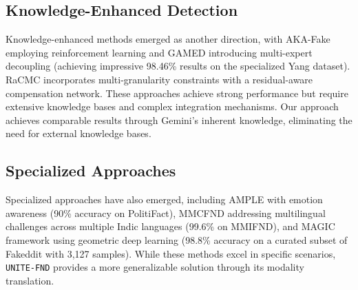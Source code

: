 \subsection{Knowledge-Enhanced Detection}
Knowledge-enhanced methods emerged as another direction, with AKA-Fake \cite{akafake2024} employing reinforcement learning and GAMED \cite{gamed2024} introducing multi-expert decoupling (achieving impressive 98.46\% results on the specialized Yang dataset). RaCMC \cite{racmc2024} incorporates multi-granularity constraints with a residual-aware compensation network. These approaches achieve strong performance but require extensive knowledge bases and complex integration mechanisms. Our approach achieves comparable results through Gemini's inherent knowledge, eliminating the need for external knowledge bases.

\subsection{Specialized Approaches}
Specialized approaches have also emerged, including AMPLE \cite{ample2024} with emotion awareness (90\% accuracy on PolitiFact), MMCFND \cite{mmcfnd2024} addressing multilingual challenges across multiple Indic languages (99.6\% on MMIFND), and MAGIC framework \cite{magic2024} using geometric deep learning (98.8\% accuracy on a curated subset of Fakeddit with 3,127 samples).  While these methods excel in specific scenarios, \texttt{UNITE-FND} provides a more generalizable solution through its modality translation.